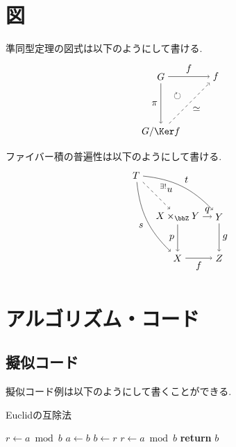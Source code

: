 \documentclass[10pt]{ltjsarticle}
\begin{document}
\section{図}

準同型定理の図式は以下のようにして書ける.
\begin{align}
	\begin{tikzpicture}[auto]
		\node (G) at (0, 2) {$G$};
		\node (Imf) at (2, 2) {$\Im f$};
		\node (GKerf) at (0, 0) {$G/\Ker f$};
		\node (Circle) at (0.6, 1.3) {$\circlearrowright$};
		\draw[->] (G) to node {$f$} (Imf);
		\draw[->] (G) to node[swap] {$\pi$} (GKerf);
		\draw[->, dashed] (GKerf) to node[swap] {$\simeq$} (Imf);
	\end{tikzpicture}
\end{align}
ファイバー積の普遍性は以下のようにして書ける.
\begin{align}
	\begin{tikzpicture}[auto]
		\node (T) at (0, 3) {$T$};
		\node (X) at (1.5, 0) {$X$};
		\node (XxY) at (1.5, 1.5) {$X\times_{\bbZ}Y$};
		\node (Z) at (3, 0) {$Z$};
		\node (Y) at (3, 1.5) {$Y$};
		\draw[->, dashed] (T) to node {${}^{\exists!}u$} (XxY);
		\draw[->] (T) to[bend left=20] node {$t$} (Y);
		\draw[->] (T) to[bend right=20] node[swap] {$s$} (X);
		\draw[->] (XxY) to node {$q$} (Y);
		\draw[->] (XxY) to node[swap] {$p$} (X);
		\draw[->] (Y) to node {$g$} (Z);
		\draw[->] (X) to node[swap] {$f$} (Z);
	\end{tikzpicture}
\end{align}
\newpage
\section{アルゴリズム・コード}

\subsection{擬似コード}

擬似コード例は以下のようにして書くことができる.

\begin{algorithm}

	\caption{Euclidの互除法}
	
	\begin{algorithmic}[1]

			\State $r\gets a\bmod b$
			 
				\State $a\gets b$
				\State $b\gets r$
				\State $r\gets a\bmod b$
			\EndWhile
			\State \textbf{return} $b$
		\EndFunction

	\end{algorithmic}

\end{algorithm}
\end{document}
